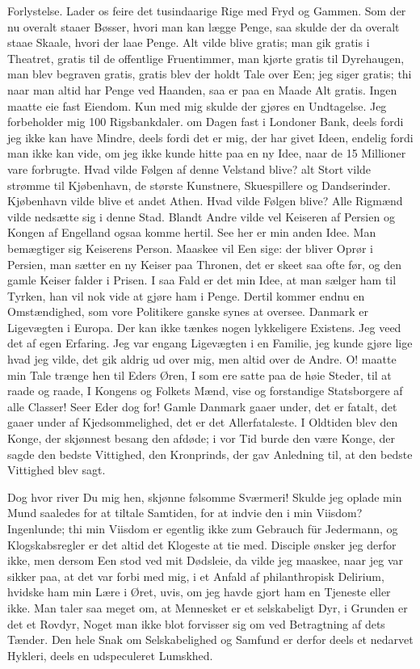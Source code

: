 \documentclass[12pt,a4paper]{article}
\begin{document}
Forlystelse. Lader os feire det tusindaarige Rige med Fryd og Gammen. Som der nu overalt staaer Bøsser, hvori man kan lægge Penge, saa skulde der da overalt staae Skaale, hvori der laae Penge. Alt vilde blive gratis; man gik gratis i Theatret, gratis til de offentlige Fruentimmer, man kjørte gratis til Dyrehaugen, man blev begraven gratis, gratis blev der holdt Tale over Een; jeg siger gratis; thi naar man altid har Penge ved Haanden, saa er paa en Maade Alt gratis. Ingen maatte eie fast Eiendom. Kun med mig skulde der gjøres en Undtagelse. Jeg forbeholder mig 100 Rigsbankdaler. om Dagen fast i Londoner Bank, deels fordi jeg ikke kan have Mindre, deels fordi det er mig, der har givet Ideen, endelig fordi man ikke kan vide, om jeg ikke kunde hitte paa en ny Idee, naar de 15 Millioner vare forbrugte. Hvad vilde Følgen af denne Velstand blive? alt Stort vilde strømme til Kjøbenhavn, de største Kunstnere, Skuespillere og Dandserinder. Kjøbenhavn vilde blive et andet Athen. Hvad vilde Følgen blive? Alle Rigmænd vilde nedsætte sig i denne Stad. Blandt Andre vilde vel Keiseren af Persien og Kongen af Engelland ogsaa komme hertil. See her er min anden Idee. Man bemægtiger sig Keiserens Person. Maaskee vil Een sige: der bliver Oprør i Persien, man sætter en ny Keiser paa Thronen, det er skeet saa ofte før, og den gamle Keiser falder i Prisen. I saa Fald er det min Idee, at man sælger ham til Tyrken, han vil nok vide at gjøre ham i Penge. Dertil kommer endnu en Omstændighed, som vore Politikere ganske synes at oversee. Danmark er Ligevægten i Europa. Der kan ikke tænkes nogen lykkeligere Existens. Jeg veed det af egen Erfaring. Jeg var engang Ligevægten i en Familie, jeg kunde gjøre lige hvad jeg vilde, det gik aldrig ud over mig, men altid over de Andre. O! maatte min Tale trænge hen til Eders Øren, I som ere satte paa de høie Steder, til at raade og raade, I Kongens og Folkets Mænd, vise og forstandige Statsborgere af alle Classer! Seer Eder dog for! Gamle Danmark gaaer under, det er fatalt, det gaaer under af Kjedsommelighed, det er det Allerfataleste. I Oldtiden blev den Konge, der skjønnest besang den afdøde; i vor Tid burde den være Konge, der sagde den bedste Vittighed, den Kronprinds, der gav Anledning til, at den bedste Vittighed blev sagt.

Dog hvor river Du mig hen, skjønne følsomme Sværmeri! Skulde jeg oplade min Mund saaledes for at tiltale Samtiden, for at indvie den i min Viisdom? Ingenlunde; thi min Viisdom er egentlig ikke zum Gebrauch für Jedermann, og Klogskabsregler er det altid det Klogeste at tie med. Disciple ønsker jeg derfor ikke, men dersom Een stod ved mit Dødsleie, da vilde jeg maaskee, naar jeg var sikker paa, at det var forbi med mig, i et Anfald af philanthropisk Delirium, hvidske ham min Lære i Øret, uvis, om jeg havde gjort ham en Tjeneste eller ikke. Man taler saa meget om, at Mennesket er et selskabeligt Dyr, i Grunden er det et Rovdyr, Noget man ikke blot forvisser sig om ved Betragtning af dets Tænder. Den hele Snak om Selskabelighed og Samfund er derfor deels et nedarvet Hykleri, deels en udspeculeret Lumskhed.
\end{document}
